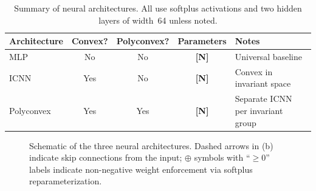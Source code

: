 \begin{table}[htbp]
\centering
\caption{Summary of neural architectures. All use softplus activations and
  two hidden layers of width~64 unless noted.}
\label{tab:architectures}
\begin{tabular}{@{}lcccl@{}}
\toprule
\textbf{Architecture} & \textbf{Convex?} & \textbf{Polyconvex?}
  & \textbf{Parameters} & \textbf{Notes} \\
\midrule
MLP            & No  & No  &
  \textbf{[N]}
  & Universal baseline \\
ICNN           & Yes & No  &
  \textbf{[N]}
  & Convex in invariant space \\
Polyconvex     & Yes & Yes &
  \textbf{[N]}
  & Separate ICNN per invariant group \\
\bottomrule
\end{tabular}
\end{table}

\begin{figure}[htbp]
\centering
\caption{Schematic of the three neural architectures.  Dashed arrows in (b)
  indicate skip connections from the input; $\oplus$ symbols with ``$\geq 0$''
  labels indicate non-negative weight enforcement via softplus
  reparameterization.}
\label{fig:architectures}
\end{figure}
